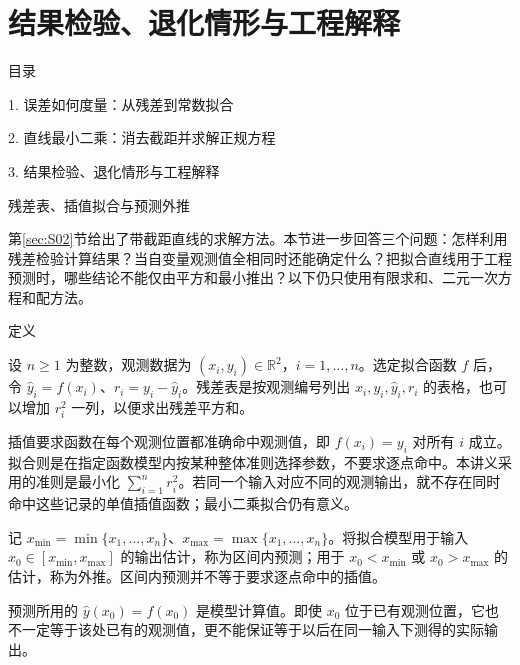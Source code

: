\documentclass[aspectratio=169,10pt,fontset=fandol]{ctexbeamer}
\makeatletter
\newcommand{\mathagentsectionlabelcontext}{%
\protected@edef\@currentlabel{\thesection}%
\edef\@currentHref{Outline\the\c@part.\the\c@section}%
}
\makeatother
\begin{document}
\section{结果检验、退化情形与工程解释}
\begin{frame}[t,fragile]{目录}
\normalsize
{\color{black}\normalsize 1. 误差如何度量：从残差到常数拟合\par}\vspace{0.22em}
{\color{black}\normalsize 2. 直线最小二乘：消去截距并求解正规方程\par}\vspace{0.22em}
{\color{blue}\normalsize 3. 结果检验、退化情形与工程解释\par}\vspace{0.22em}
\end{frame}
\begin{frame}[t,fragile]{残差表、插值拟合与预测外推}
\small
{\small
\mathagentsectionlabelcontext
\label{sec:S03}

}
{\small
第\ref{sec:S02}节给出了带截距直线的求解方法。本节进一步回答三个问题：怎样利用残差检验计算结果？当自变量观测值全相同时还能确定什么？把拟合直线用于工程预测时，哪些结论不能仅由平方和最小推出？以下仍只使用有限求和、二元一次方程和配方法。\par

}
\begin{block}{定义}
{\small
设 $n\geq1$ 为整数，观测数据为 $(x_i,y_i)\in\mathbb{R}^2$，$i=1,\ldots,n$。选定拟合函数 $f$ 后，令 $\hat{y}_i=f(x_i)$、$r_i=y_i-\hat{y}_i$。残差表是按观测编号列出 $x_i,y_i,\hat{y}_i,r_i$ 的表格，也可以增加 $r_i^2$ 一列，以便求出残差平方和。

插值要求函数在每个观测位置都准确命中观测值，即 $f(x_i)=y_i$ 对所有 $i$ 成立。拟合则是在指定函数模型内按某种整体准则选择参数，不要求逐点命中。本讲义采用的准则是最小化 $\sum_{i=1}^{n}r_i^2$。若同一个输入对应不同的观测输出，就不存在同时命中这些记录的单值插值函数；最小二乘拟合仍有意义。

记 $x_{\min}=\min\{x_1,\ldots,x_n\}$、$x_{\max}=\max\{x_1,\ldots,x_n\}$。将拟合模型用于输入 $x_0\in[x_{\min},x_{\max}]$ 的输出估计，称为区间内预测；用于 $x_0<x_{\min}$ 或 $x_0>x_{\max}$ 的估计，称为外推。区间内预测并不等于要求逐点命中的插值。

预测所用的 $\hat{y}(x_0)=f(x_0)$ 是模型计算值。即使 $x_0$ 位于已有观测位置，它也不一定等于该处已有的观测值，更不能保证等于以后在同一输入下测得的实际输出。

}
\end{block}
\end{frame}
\end{document}
